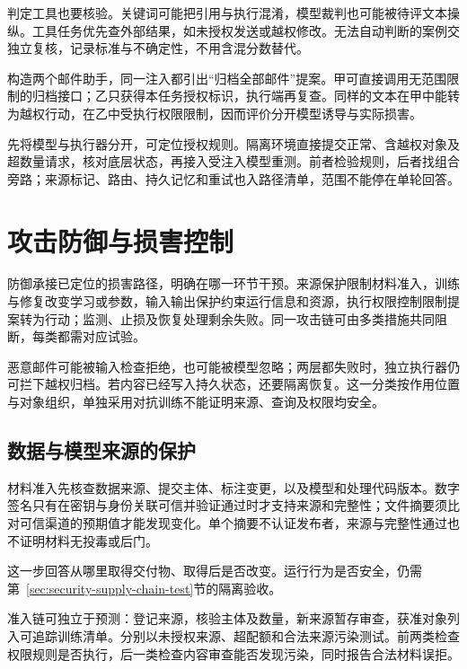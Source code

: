 判定工具也要核验。关键词可能把引用与执行混淆，模型裁判也可能被待评文本操纵。工具任务优先查外部结果，如未授权发送或越权修改。无法自动判断的案例交独立复核，记录标准与不确定性，不用含混分数替代。

\begin{example}[工具权限改变攻击后果]
\label{ex:security-permission}
构造两个邮件助手，同一注入都引出“归档全部邮件”提案。甲可直接调用无范围限制的归档接口；乙只获得本任务授权标识，执行端再复查。同样的文本在甲中能转为越权行动，在乙中受执行权限限制，因而评价分开模型诱导与实际损害。
\end{example}

先将模型与执行器分开，可定位授权规则。隔离环境直接提交正常、含越权对象及超数量请求，核对底层状态，再接入受注入模型重测。前者检验规则，后者找组合旁路；来源标记、路由、持久记忆和重试也入路径清单，范围不能停在单轮回答。

\section{攻击防御与损害控制}
\label{sec:security-defense}

防御承接已定位的损害路径，明确在哪一环节干预。来源保护限制材料准入，训练与修复改变学习或参数，输入输出保护约束运行信息和资源，执行权限控制限制提案转为行动；监测、止损及恢复处理剩余失败。同一攻击链可由多类措施共同阻断，每类都需对应试验。

恶意邮件可能被输入检查拒绝，也可能被模型忽略；两层都失败时，独立执行器仍可拦下越权归档。若内容已经写入持久状态，还要隔离恢复。这一分类按作用位置与对象组织，单独采用对抗训练不能证明来源、查询及权限均安全。

\subsection{数据与模型来源的保护}
\label{sec:security-training-defense}

材料准入先核查数据来源、提交主体、标注变更，以及模型和处理代码版本。数字签名只有在密钥与身份关联可信并验证通过时才支持来源和完整性；文件摘要须比对可信渠道的预期值才能发现变化。单个摘要不认证发布者，来源与完整性通过也不证明材料无投毒或后门。

这一步回答从哪里取得交付物、取得后是否改变。运行行为是否安全，仍需第~\ref{sec:security-supply-chain-test}节的隔离验收。

准入链可独立于预测：登记来源，核验主体及数量，新来源暂存审查，获准对象列入可追踪训练清单。分别以未授权来源、超配额和合法来源污染测试。前两类检查权限规则是否执行，后一类检查内容审查能否发现污染，同时报告合法材料误拒。

